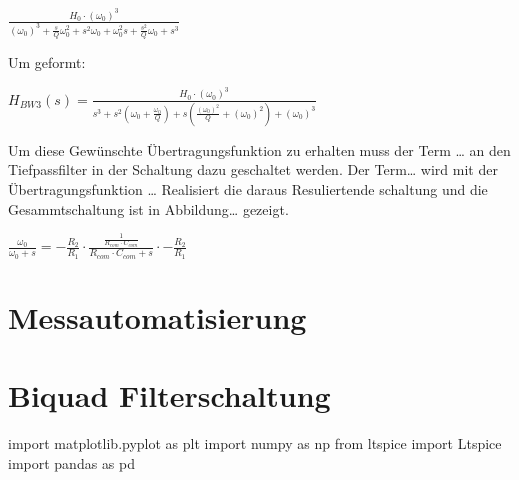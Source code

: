 \documentclass[
  ngerman,
  letterpaper,
  DIV=11]{scrreprt}
\newenvironment{Shaded}{}{}
\newcommand{\ImportTok}[1]{\textcolor[rgb]{0.01,0.18,0.38}{#1}}
\newcommand{\NormalTok}[1]{\textcolor[rgb]{0.14,0.16,0.18}{#1}}
\begin{document}
\(\frac{H_0 \cdot (\omega_0)^3} {(\omega_0)^3 + \frac{s}{Q}\omega_0^2+s^2\omega_0+\omega_0^2s + \frac{s^2}{Q}\omega_0 + s^3}\)

Um geformt:

\(H_{BW3}(s) = \frac{H_0 \cdot (\omega_0)^3}{s^3 + s^2(\omega_0+\frac{\omega_0}{Q})+s(\frac{(\omega_0)^2}{Q}+(\omega_0)^2) +(\omega_0)^3}\)

Um diese Gewünschte Übertragungsfunktion zu erhalten muss der Term
\ldots{} an den Tiefpassfilter in der Schaltung dazu geschaltet werden.
Der Term\ldots{} wird mit der Übertragungsfunktion \ldots{} Realisiert
die daraus Resuliertende schaltung und die Gesammtschaltung ist in
Abbildung\ldots{} gezeigt.

\(\frac{\omega_0}{\omega_0 +s} = -\frac{R_2}{R_1} \cdot \frac{\frac{1}{R_{com} \cdot C_{com}}}{R_{com} \cdot C_{com} +s} \cdot -\frac{R_2}{R_1}\)

\chapter{Messautomatisierung}\label{messautomatisierung}

\chapter{Biquad Filterschaltung}\label{biquad-filterschaltung}

\begin{Shaded}
\begin{Highlighting}[]
\ImportTok{import}\NormalTok{ matplotlib.pyplot }\ImportTok{as}\NormalTok{ plt}
\ImportTok{import}\NormalTok{ numpy }\ImportTok{as}\NormalTok{ np}
\ImportTok{from}\NormalTok{ ltspice }\ImportTok{import}\NormalTok{ Ltspice}
\ImportTok{import}\NormalTok{ pandas }\ImportTok{as}\NormalTok{ pd}
\end{Highlighting}
\end{Shaded}
\end{document}
